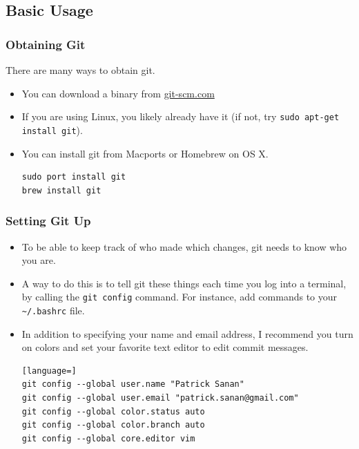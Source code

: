 \subsection{Basic Usage}
\begin{frame}[fragile]
\frametitle{Obtaining Git}
There are many ways to obtain git.
\begin{itemize}
  \item You can download a binary from \href{http://git-scm.com}{git-scm.com}
\item If you are using Linux, you likely already have it (if not, try \lstinline{sudo apt-get install git}).
\item You can install git from Macports or Homebrew on OS X.
\begin{lstlisting}
sudo port install git
brew install git
\end{lstlisting}

\end{itemize}
\end{frame}

\begin{frame}[fragile]
\frametitle{Setting Git Up}
\begin{itemize}
\item
To be able to keep track of who made which changes, git needs to know who you are.
\item
A way to do this is to tell git these things each time you log into a terminal, by calling the \lstinline{git config} command. For instance, add commands to your \lstinline{~/.bashrc} file.
\item
In addition to specifying your name and email address, I recommend you turn on colors and set your favorite text editor to edit commit messages.
\begin{lstlisting}[language=]
git config --global user.name "Patrick Sanan"
git config --global user.email "patrick.sanan@gmail.com"
git config --global color.status auto
git config --global color.branch auto
git config --global core.editor vim
\end{lstlisting}
\end{itemize}
\end{frame}

